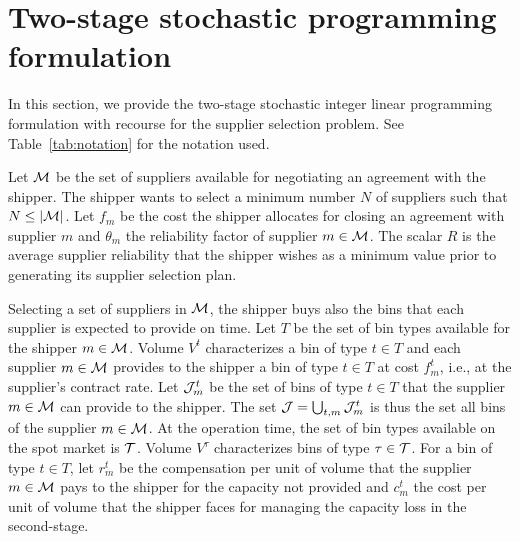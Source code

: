 \documentclass[a4paper,11pt]{article}
\begin{document}
	\section{Two-stage stochastic programming formulation}\label{s:2stage}
	In this section, we provide the two-stage stochastic integer linear programming formulation with recourse for the supplier selection problem.
	See Table~\ref{tab:notation} for the notation used.
	
	Let $\cal{M}$ be the set of suppliers available for negotiating an agreement with the shipper.
	The shipper wants to select a minimum number $N$ of suppliers such that $ N \le |\cal{M}|$.
	Let ${f_{m}}$ be the cost the shipper allocates for closing an agreement with supplier $ m$ and $\theta_{m}$ the reliability factor of supplier $m \in \cal{M}$.
	The scalar $R$ is the average supplier reliability that the shipper wishes as a minimum value prior to generating its supplier selection plan.
	
	Selecting a set of suppliers in $\cal{M}$, the shipper buys also the bins that each supplier is expected to provide on time.
	Let $T$ be the set of bin types available for the shipper $m \in \cal{M}$. %
	Volume $V^{t}$ characterizes a bin of type $ t \in T$ and each supplier $m \in \cal M$ provides to the shipper a bin of type $ t \in T$ at cost $f_{m}^{t}$, i.e., at the supplier's contract rate.
	Let ${\cal J}^t_m$ be the set of bins of type $ t \in T$ that the supplier $ m \in \cal{M}$ can provide to the shipper.
	The set ${\cal J} = \bigcup_{t,m} {\cal J}^{t}_{m}$ is thus the set all bins of the supplier $m \in \cal{M}$.
	At the operation time, the set of bin types available on the spot market is ${\cal T}$.
	Volume $V^{\tau}$ characterizes bins of type $\tau \in \cal{T}$.
	For a bin of type $t \in T$, let $r_{m}^t$ be the compensation per unit of volume that the supplier $m \in \cal M$ pays to the shipper for the capacity not provided and $c_{m}^t$ the cost per unit of volume that the shipper faces for managing the capacity loss in the second-stage.
	
\end{document}
